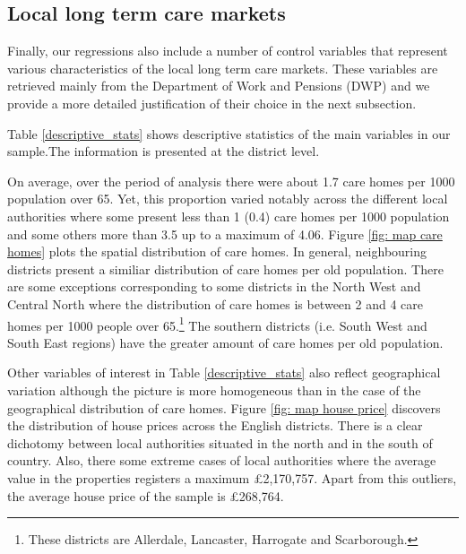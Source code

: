 \documentclass[12pt,letterpaper]{article}
\begin{document}
   \subsection{Local long term care markets}
    
    Finally, our regressions also include a number of control variables 
    that represent various characteristics of the local long term care markets. These variables are retrieved mainly from the Department of 
    Work and Pensions (DWP) and we provide a more detailed justification of 
    their choice in the next subsection.
  
 Table \ref{descriptive_stats} shows descriptive statistics of the 
 main variables in our sample.The information is presented at the district level. 
 
 
  {}
 
 On average, over the period of analysis
 there were about 1.7 care homes per 1000 population over 65. 
 Yet,  this proportion varied notably across the different local authorities 
 where some present less than 1 (0.4) care homes per 1000 population
  and some others more than 3.5 up to a maximum of 4.06. Figure \ref{fig: map care homes} plots the spatial distribution
  of care homes. In general, neighbouring districts present a similiar 
  distribution of care homes per old population. There are some exceptions corresponding to some districts in the 
  North West and Central North where the distribution of care homes is between 2 and 4 care homes per 1000 people over 65.\footnote{These districts
  are Allerdale, Lancaster, Harrogate and Scarborough.} 
  The southern districts (i.e. South West and South East regions) have the 
  greater amount of care homes per old population. 
 
 
  {}
  
  
 Other variables of interest in Table \ref{descriptive_stats}
  also reflect geographical variation although the picture is more homogeneous than in the case of the geographical
  distribution of care homes. Figure \ref{fig: map house price} 
  discovers the distribution of house prices across the English districts. There 
  is a clear dichotomy between local authorities situated in the north and in 
  the south of country. Also, there some extreme cases of local authorities where the 
  average value in the properties registers a maximum £2,170,757. Apart from this outliers, the average house price
  of the sample is £268,764.
  
\end{document}
